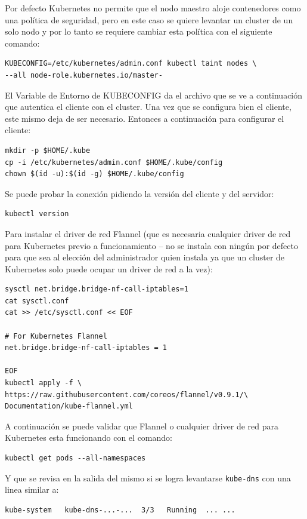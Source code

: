 Por defecto Kubernetes no permite que el nodo maestro aloje contenedores como una política de seguridad, pero en este caso se quiere levantar un cluster de un solo nodo y por lo tanto se requiere cambiar esta política con el siguiente comando:
    \begin{lstlisting}
KUBECONFIG=/etc/kubernetes/admin.conf kubectl taint nodes \
--all node-role.kubernetes.io/master-
    \end{lstlisting}
El Variable de Entorno de KUBECONFIG da el archivo que se ve a continuación que autentica el cliente con el cluster. Una vez que se configura bien el cliente, este mismo deja de ser necesario. Entonces a continuación para configurar el cliente:
    \begin{lstlisting}
mkdir -p $HOME/.kube
cp -i /etc/kubernetes/admin.conf $HOME/.kube/config
chown $(id -u):$(id -g) $HOME/.kube/config
    \end{lstlisting}
\citep{kubernetes-create-cluster-kubeadm}

Se puede probar la conexión pidiendo la versión del cliente y del servidor:
\begin{lstlisting}
kubectl version
\end{lstlisting}
\citep{kubernetes-create-cluster-kubeadm}

Para instalar el driver de red Flannel (que es necesaria cualquier driver de red para Kubernetes previo a funcionamiento -- no se instala con ningún por defecto para que sea al elección del administrador quien instala ya que un cluster de Kubernetes solo puede ocupar un driver de red a la vez):
\begin{lstlisting}
sysctl net.bridge.bridge-nf-call-iptables=1
cat sysctl.conf
cat >> /etc/sysctl.conf << EOF

# For Kubernetes Flannel
net.bridge.bridge-nf-call-iptables = 1

EOF
kubectl apply -f \
https://raw.githubusercontent.com/coreos/flannel/v0.9.1/\
Documentation/kube-flannel.yml
\end{lstlisting}
\citep{kubernetes-cluster-networking}

A continuación se puede validar que Flannel o cualquier driver de red para Kubernetes esta funcionando con el comando:
\begin{lstlisting}
kubectl get pods --all-namespaces
\end{lstlisting}
Y que se revisa en la salida del mismo si se logra levantarse \texttt{kube-dns} con una linea similar a:
\begin{lstlisting}
kube-system   kube-dns-...-...  3/3   Running  ... ...
\end{lstlisting}
\citep{kubernetes-create-cluster-kubeadm}

